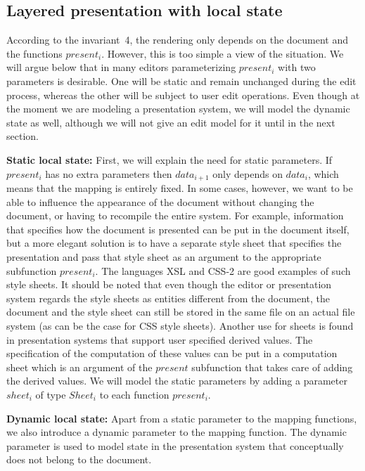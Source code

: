 \subsection{Layered presentation with local state}


According to the invariant~4, the rendering only depends on the document and the functions $present_i$. However, this is too simple a view of the situation. We will argue below that in many editors parameterizing $present_i$ with two parameters is desirable. One will be static and remain unchanged during the edit process, whereas the other will be subject to user edit operations. Even though at the moment we are modeling a presentation system, we will model the dynamic state as well, although we will not give an edit model for it until in the next section.

{\bf Static local state:} First, we will explain the need for static parameters. If $present_i$ has no extra parameters then $data_{i+1}$ only depends on $data_i$, which means that the mapping is entirely fixed. In some cases, however, we want to be able to influence the appearance of the document without changing the document, or having to recompile the entire system. For example, information that specifies how the document is presented can be put in the document itself, but a more elegant solution is to have a separate style sheet that specifies the presentation and pass that style sheet as an argument to the appropriate subfunction $present_i$. The languages XSL\cite{xsl} and CSS-2\cite{css} are good examples of such style sheets. It should be noted that even though the editor or presentation system regards the style sheets as entities different from the document, the document and the style sheet can still be stored in the same file on an actual file system (as can be the case for CSS style sheets). Another use for sheets is found in presentation systems that support user specified derived values. The specification of the computation of these values can be put in a computation sheet which is an argument of the $present$ subfunction that takes care of adding the derived values. We will model the static parameters by adding a parameter $sheet_{i}$ of type $Sheet_i$ to each function $present_i$.

{\bf Dynamic local state:} Apart from a static parameter to the mapping functions, we also introduce a dynamic parameter to the mapping function. The dynamic parameter is used to model state in the presentation system that conceptually does not belong to the document. 

